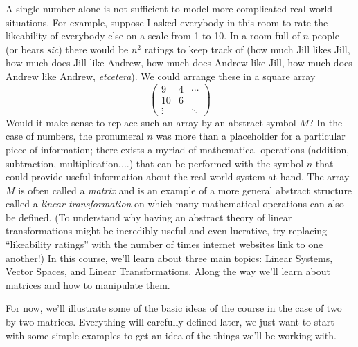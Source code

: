 {A single number alone is not sufficient to model more complicated real world situations. For example, suppose I asked everybody in this
room to rate the likeability of everybody else on a scale from 1 to 10. In a room full of $n$ people (or bears {\itshape sic}) there would be $n^2$ 
ratings to keep track of (how much Jill likes Jill, how much does Jill like Andrew, how much does Andrew like Jill, how much does Andrew like Andrew, {\itshape etcetera}). We could arrange these in a square array
\begin{equation*}
    \begin{pmatrix}
      9             &4  &\cdots\\
      10             &6 &\\
    \vdots & & \ddots      
    \end{pmatrix}
 \end{equation*}
Would it make sense to replace such an array by an abstract symbol $M$? In the case of numbers, the pronumeral $n$ was more
than a placeholder for a particular piece of information; there exists a myriad of mathematical operations (addition, subtraction, multiplication,...) that can be  performed with the symbol $n$ that could provide useful information about the real world system at hand.
The array $M$ is often called a {\itshape matrix} and is an example of a more general abstract structure called a {\itshape linear transformation}
on which many mathematical operations can also be defined.
(To understand why having an abstract theory of linear transformations might be incredibly useful and even lucrative, try replacing ``likeability ratings'' with the number of times internet websites link to one another!)
In this course, we'll learn about three main topics: Linear Systems, Vector Spaces, and Linear Transformations.  Along the way we'll learn about matrices and how to manipulate them.  

For now, we'll illustrate some of  the basic ideas of the course in the case of two by two matrices.  Everything will carefully defined later, we just want
to start with some simple examples to get an idea of the things we'll be working with.

}





